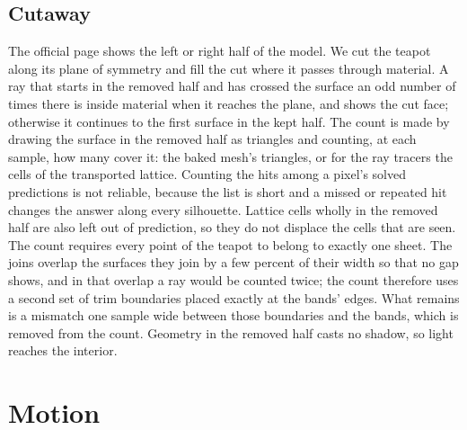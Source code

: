\documentclass[journal]{IEEEtran}
\begin{document}
\subsection{Cutaway}

The official page shows the left or right half of the model. We cut the
teapot along its plane of symmetry and fill the cut where it passes
through material. A ray that starts in the removed half and has crossed
the surface an odd number of times there is inside material when it
reaches the plane, and shows the cut face; otherwise it continues to
the first surface in the kept half. The count is made by drawing the
surface in the removed half as triangles and counting, at each sample,
how many cover it: the baked mesh's triangles, or for the ray tracers
the cells of the transported lattice. Counting the hits among a pixel's
solved predictions is not reliable, because the
list is short and a missed or repeated hit changes the answer along
every silhouette. Lattice cells wholly in the removed half are also
left out of prediction, so they do not displace the cells that are
seen. The count requires every
point of the teapot to belong to exactly one sheet. The joins overlap
the surfaces they join by a few percent of their width so that no gap
shows, and in that overlap a ray would be counted twice; the count
therefore uses a second set of trim boundaries placed exactly at the
bands' edges. What remains is a mismatch one sample wide between those
boundaries and the bands, which is removed from the count. Geometry in
the removed half casts no shadow, so light reaches the interior. 

\section{Motion}
\label{sec:motion}
\end{document}
